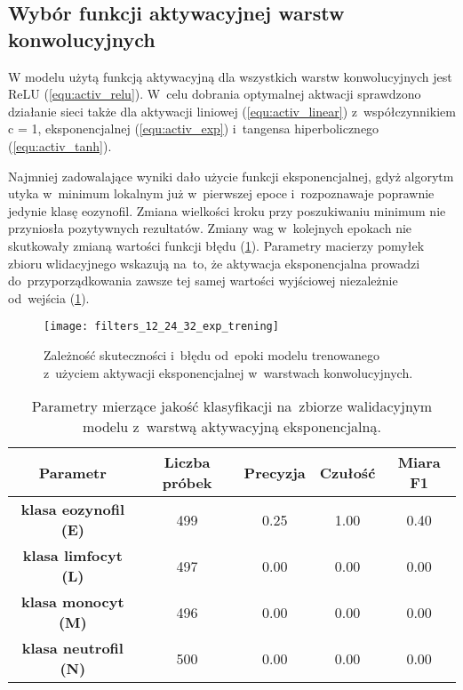 \subsection{Wybór funkcji aktywacyjnej warstw konwolucyjnych}

W modelu użytą funkcją aktywacyjną dla wszystkich warstw konwolucyjnych jest ReLU (\ref{equ:activ_relu}). W~celu dobrania optymalnej aktwacji sprawdzono działanie sieci także dla aktywacji liniowej (\ref{equ:activ_linear}) z~współczynnikiem c = 1, eksponencjalnej (\ref{equ:activ_exp}) i~tangensa hiperbolicznego (\ref{equ:activ_tanh}). 

{\parindent0pt
Najmniej zadowalające wyniki dało użycie funkcji eksponencjalnej, gdyż algorytm utyka w~minimum lokalnym już w~pierwszej epoce i~rozpoznawaje poprawnie jedynie klasę eozynofil. Zmiana wielkości kroku przy poszukiwaniu minimum nie przyniosła pozytywnych rezultatów. Zmiany wag w~kolejnych epokach nie skutkowały zmianą wartości funkcji błędu (\ref{fig:filters_12_24_32_exp_trening}). Parametry macierzy pomyłek zbioru wlidacyjnego wskazują na~to, że aktywacja eksponencjalna prowadzi do~przyporządkowania zawsze tej samej wartości wyjściowej niezależnie od~wejścia (\ref{tab:exp_act_layers_params_val}).

\begin{figure}[h!]
	\centering
	\centering
		\texttt{[image: filters\_12\_24\_32\_exp\_trening]}	
	\caption{Zależność skuteczności i~błędu od~epoki modelu trenowanego z~użyciem aktywacji eksponencjalnej w~warstwach konwolucyjnych.}\label{fig:filters_12_24_32_exp_trening}
\end{figure}

\begin{table}[h!]
\centering
\caption[Short Heading]{Parametry mierzące jakość klasyfikacji na~zbiorze walidacyjnym modelu z~warstwą aktywacyjną eksponencjalną.}
\label{tab:exp_act_layers_params_val}
\begin{tabular}{|c|c|c|c|c|}
\hline
\textbf{Parametr}                            & \textbf{Liczba próbek}    & \textbf{Precyzja} & \textbf{Czułość} & \textbf{Miara F1} \\ \hline
\textbf{klasa eozynofil (E)} & 499  & 0.25   & 1.00   & 0.40 \\ \hline
\textbf{klasa limfocyt (L)} & 497 & 0.00   & 0.00   & 0.00 \\ \hline
\textbf{klasa monocyt (M)}  & 496 & 0.00   & 0.00   & 0.00 \\ \hline
\textbf{klasa neutrofil (N)}  & 500 & 0.00   & 0.00    & 0.00  \\ \hline
\end{tabular}
\end{table}

}
